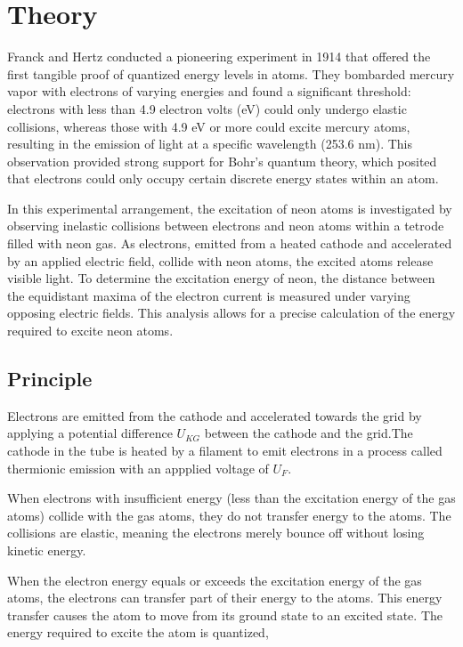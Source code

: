 \section{Theory}

Franck and Hertz conducted a pioneering experiment in 1914 that offered the first tangible proof of quantized energy levels in atoms. They bombarded mercury vapor with electrons of varying energies and found a significant threshold: electrons with less than 4.9 electron volts (eV) could only undergo elastic collisions, whereas those with 4.9 eV or more could excite mercury atoms, resulting in the emission of light at a specific wavelength (253.6 nm). This observation provided strong support for Bohr's quantum theory, which posited that electrons could only occupy certain discrete energy states within an atom.

In this experimental arrangement, the excitation of neon atoms is investigated by observing inelastic collisions between electrons and neon atoms within a tetrode filled with neon gas. As electrons, emitted from a heated cathode and accelerated by an applied electric field, collide with neon atoms, the excited atoms release visible light. To determine the excitation energy of neon, the distance between the equidistant maxima of the electron current is measured under varying opposing electric fields. This analysis allows for a precise calculation of the energy required to excite neon atoms.

\subsection*{Principle}

Electrons are emitted from the cathode and accelerated towards the grid by applying a potential difference $U_{KG}$ between the cathode and the grid.The cathode in the tube is heated by a filament to emit electrons in a process called thermionic emission with an appplied voltage of $U_F$.

When electrons with insufficient energy (less than the excitation energy of the gas atoms) collide with the gas atoms, they do not transfer energy to the atoms. The collisions are elastic, meaning the electrons merely bounce off without losing kinetic energy.

When the electron energy equals or exceeds the excitation energy of the gas atoms, the electrons can transfer part of their energy to the atoms. This energy transfer
causes the atom to move from its ground state to an excited state. The energy required to excite the atom is quantized,

